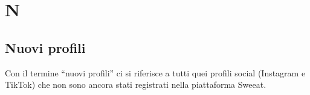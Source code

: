 \section{N}

\subsection{Nuovi profili} Con il termine “nuovi profili” ci si riferisce a tutti quei profili social (Instagram e TikTok) che non sono ancora stati registrati nella piattaforma Sweeat.

\clearpage